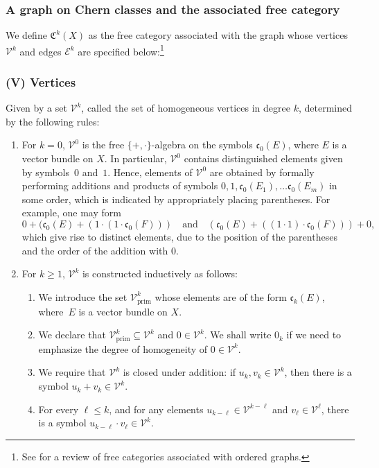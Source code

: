 \documentclass[JEP,XML,SOM,Unicode,published]{cedram}
\newcommand{\quand}{\quad\text{and}\quad}
\theoremstyle{plain}
\theoremstyle{definition}
\newcommand{\Ecal}{\mathcal E}
\newcommand{\Vcal}{\mathcal V}
\newcommand{\Cfrak}{\mathfrak C}
\newcommand{\cfrak}{\mathfrak c}
\newcommand{\prim}{\mathrm{prim}}
\begin{document}
\subsubsection*{A graph on Chern classes and the associated free category} We define $\Cfrak^{k}(X)$ as the free category associated with the graph whose vertices $\Vcal^{k}$ and edges $\Ecal^{k}$ are specified below:\footnote{See \cite[Chap.\,II, Section 7]{MacLane-cat} for a review of free categories associated with ordered graphs.}

\subsubsection*{\textup{(V)} Vertices}
Given by a set $\Vcal^k$, called the set of homogeneous vertices in degree $k$, determined by the following rules:
\begin{enumerate}
\item For $k=0$, $\Vcal^{0}$ is the free $\lbrace +,\cdot\rbrace$-algebra on the symbols $\cfrak_{0}(E)$, where $E$ is a vector bundle on $X$. In particular, $\Vcal^{0}$ contains distinguished elements given by symbols~$0$ and~$1$. Hence, elements of $\Vcal^{0}$ are obtained by formally performing additions and products of symbols $0, 1,\cfrak_{0}(E_{1}),\ldots\cfrak_{0}(E_{m})$ in some order, which is indicated by appropriately placing parentheses. For example, one may form
\begin{displaymath}
0+(\cfrak_{0}(E) + (1 \cdot (1 \cdot \cfrak_{0}(F))) \quand (\cfrak_{0}(E) + ((1 \cdot 1) \cdot\cfrak_{0}(F)))+0,
\end{displaymath}
which give rise to distinct elements, due to the position of the parentheses and the order of the addition with 0.

\item For $k \geq 1$, $\Vcal^k$ is constructed inductively as follows:
\begin{enumerate}
\item We introduce the set $\Vcal^k_{\prim}$ whose elements are of the form $\cfrak_{k}(E)$, where~$E$ is a vector bundle on $X$.

\item We declare that $\Vcal^k_{\prim} \subseteq \Vcal^k$ and $0 \in \Vcal^k$. We shall write $0_{k}$ if we need to emphasize the degree of homogeneity of $0 \in \Vcal^k$.

\item We require that $\Vcal^{k}$ is closed under addition: if $u_k, v_k \in \Vcal^k$, then there is a symbol $u_k + v_k \in \Vcal^k$.

\item For every $\ell\leq k$, and for any elements $u_{k-\ell} \in \Vcal^{k-\ell}$ and $ v_\ell \in \Vcal^{\ell}$, there is a symbol $u_{k-\ell} \cdot v_{\ell} \in \Vcal^{k}$.
\end{enumerate}
\end{enumerate}
\end{document}
